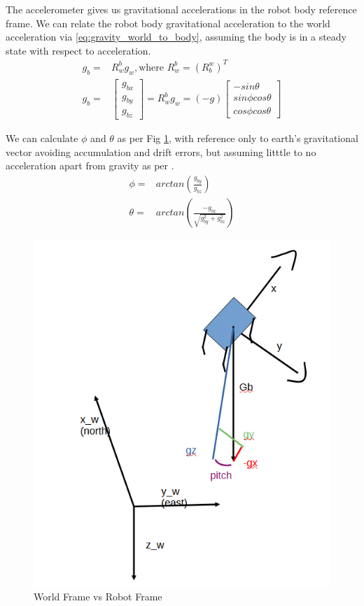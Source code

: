 \documentclass[conference]{IEEEtran}
\begin{document}
The accelerometer gives us gravitational accelerations in the robot body reference frame. We can relate the robot body gravitational acceleration to the world acceleration via \eqref{eq:gravity_world_to_body}, assuming the body is in a steady state with respect to acceleration.
\begin{align}
g_b =& R_w^b g_w, \text{where } R_w^b = (R_b^w)^T\\
g_b =& \begin{bmatrix} g_{bx}\\ g_{by}\\ g_{bz} \end{bmatrix} = R_{w}^b g_w = (-g) \begin{bmatrix} -sin \theta \\ sin \phi cos \theta \\ cos \phi cos \theta \end{bmatrix} \label{eq:gravity_world_to_body}
\end{align}

We can calculate $\phi$ and $\theta$ as per Fig \ref{fig:pitch}, with reference only to earth's gravitational vector avoiding accumulation and drift errors, but assuming litttle to no acceleration apart from gravity as per \cite{b19}.
\begin{align}
\phi =& arctan \left( \frac{g_{by}}{g_{bz}} \right)\\
\theta =& arctan \left( \frac{ - g_{bx}}{\sqrt{g_{by}^2 + g_{bz}^2}} \right )
\end{align}

\begin{figure}[h!]
  \includegraphics[width=\columnwidth]{fig_1_pitch.png}
  \caption{World Frame vs Robot Frame}
  \label{fig:pitch}
\end{figure}
\end{document}
